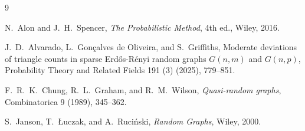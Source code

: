 \documentclass[12pt]{article}
\theoremstyle{plain}
\theoremstyle{definition}
\theoremstyle{remark}
\begin{document}
\begin{thebibliography}{9}


N.~Alon and J.~H.~Spencer,
\emph{The Probabilistic Method}, 4th ed., Wiley, 2016.

J.~D.~Alvarado, L.~Gon\c{c}alves de Oliveira, and S.~Griffiths, Moderate deviations of triangle counts in sparse Erd\H os-R\'enyi random graphs $G(n, m)$ and $G(n, p)$, Probability Theory and Related Fields 191 (3) (2025), 779--851.

F.~R.~K.~Chung, R.~L.~Graham, and R.~M.~Wilson,
\emph{Quasi-random graphs}, Combinatorica 9 (1989), 345--362.

S.~Janson, T.~\L uczak, and A.~Ruci\'nski,
\emph{Random Graphs}, Wiley, 2000.


\end{thebibliography}
\end{document}
